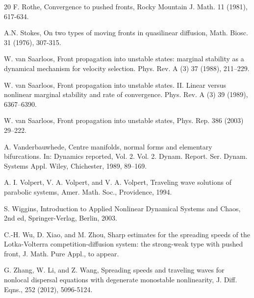 \documentclass[11pt,a4paper]{article}
\numberwithin{equation}{section}
\numberwithin{figure}{section}
\begin{document}
\begin{thebibliography}{20}
{F. Rothe},
Convergence to pushed fronts, Rocky Mountain J. Math. 11 (1981), 617-634.

{A.N. Stokes}, On two types of moving fronts in quasilinear diffusion, Math. Biosc.
31 (1976), 307-315.



{W. van Saarloos},
Front propagation into unstable states: marginal stability as a dynamical mechanism
for velocity selection. Phys. Rev. A (3) 37 (1988), 211–229.

{W. van Saarloos},
Front propagation into unstable states. II. Linear versus nonlinear marginal
stability and rate of convergence. Phys. Rev. A (3) 39 (1989), 6367–6390.

{W. van Saarloos},
Front propagation into unstable states, Phys. Rep. 386 (2003) 29–222.

{A. Vanderbauwhede}, Centre manifolds, normal forms and elementary bifurcations. In:
Dynamics reported, Vol. 2. Vol. 2. Dynam. Report. Ser. Dynam. Systems Appl. Wiley,
Chichester, 1989, 89–169.

{A. I. Volpert, V. A. Volpert, and V. A. Volpert},
Traveling wave solutions of parabolic systems,
Amer. Math. Soc., Providence, 1994.


{S. Wiggins},
Introduction to Applied Nonlinear Dynamical Systems and Chaos, 2nd ed, Springer-Verlag, Berlin, 2003.



{C.-H. Wu, D. Xiao, and M. Zhou},
Sharp estimates for the spreading speeds of the Lotka-Volterra competition-diffusion system: the strong-weak type with pushed front,
J. Math. Pure Appl.,
to appear.

{G. Zhang, W. Li, and Z. Wang},
Spreading speeds and traveling waves for nonlocal dispersal equations with degenerate monostable nonlinearity,
J. Diff. Eqns., 252 (2012), 5096-5124.

\end{thebibliography}
\end{document}
